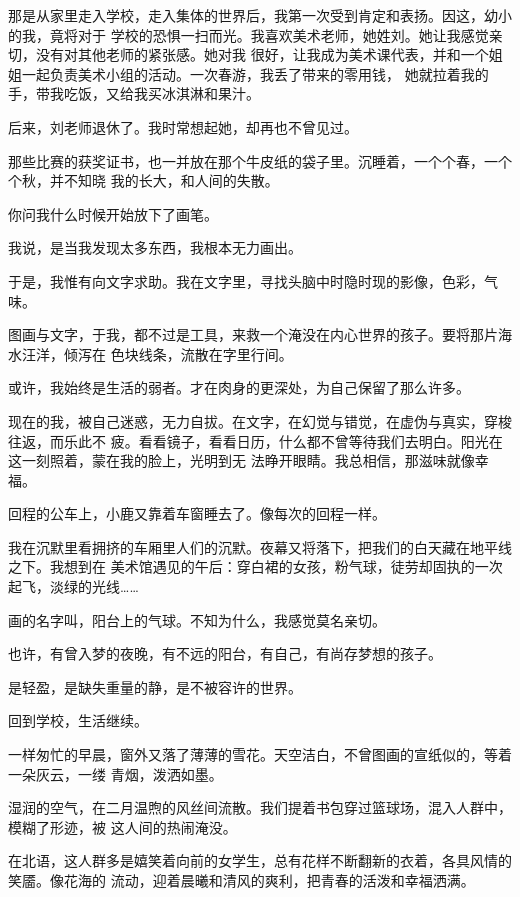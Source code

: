 		那是从家里走入学校，走入集体的世界后，我第一次受到肯定和表扬。因这，幼小的我，竟将对于
	学校的恐惧一扫而光。我喜欢美术老师，她姓刘。她让我感觉亲切，没有对其他老师的紧张感。她对我
	很好，让我成为美术课代表，并和一个姐姐一起负责美术小组的活动。一次春游，我丢了带来的零用钱，
	她就拉着我的手，带我吃饭，又给我买冰淇淋和果汁。

		后来，刘老师退休了。我时常想起她，却再也不曾见过。

		那些比赛的获奖证书，也一并放在那个牛皮纸的袋子里。沉睡着，一个个春，一个个秋，并不知晓
	我的长大，和人间的失散。

		你问我什么时候开始放下了画笔。

		我说，是当我发现太多东西，我根本无力画出。

		于是，我惟有向文字求助。我在文字里，寻找头脑中时隐时现的影像，色彩，气味。

		图画与文字，于我，都不过是工具，来救一个淹没在内心世界的孩子。要将那片海水汪洋，倾泻在
	色块线条，流散在字里行间。

		或许，我始终是生活的弱者。才在肉身的更深处，为自己保留了那么许多。

		现在的我，被自己迷惑，无力自拔。在文字，在幻觉与错觉，在虚伪与真实，穿梭往返，而乐此不
	疲。看看镜子，看看日历，什么都不曾等待我们去明白。阳光在这一刻照着，蒙在我的脸上，光明到无
	法睁开眼睛。我总相信，那滋味就像幸福。

		回程的公车上，小鹿又靠着车窗睡去了。像每次的回程一样。

		我在沉默里看拥挤的车厢里人们的沉默。夜幕又将落下，把我们的白天藏在地平线之下。我想到在
	美术馆遇见的午后：穿白裙的女孩，粉气球，徒劳却固执的一次起飞，淡绿的光线……

		画的名字叫，阳台上的气球。不知为什么，我感觉莫名亲切。

		也许，有曾入梦的夜晚，有不远的阳台，有自己，有尚存梦想的孩子。

		是轻盈，是缺失重量的静，是不被容许的世界。

	\endwriting



		回到学校，生活继续。

		一样匆忙的早晨，窗外又落了薄薄的雪花。天空洁白，不曾图画的宣纸似的，等着一朵灰云，一缕
	青烟，泼洒如墨。

		湿润的空气，在二月温煦的风丝间流散。我们提着书包穿过篮球场，混入人群中，模糊了形迹，被
	这人间的热闹淹没。

		在北语，这人群多是嬉笑着向前的女学生，总有花样不断翻新的衣着，各具风情的笑靥。像花海的
	流动，迎着晨曦和清风的爽利，把青春的活泼和幸福洒满。

